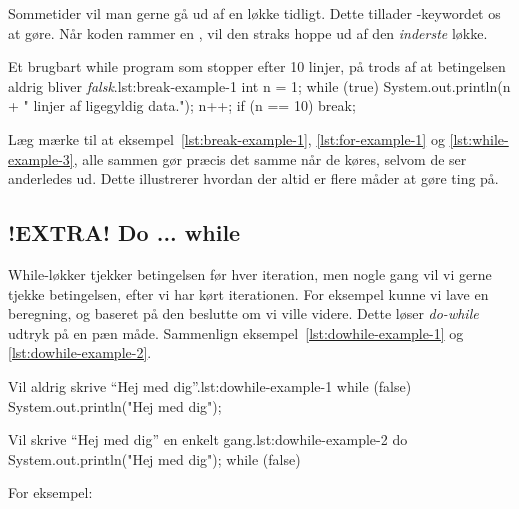 
		Sommetider vil man gerne gå ud af en løkke tidligt. Dette tillader
        -keywordet os at gøre. Når koden rammer en
        , vil den straks hoppe ud af den
        \emph{inderste} løkke.

        \begin{JavaCode}{Et brugbart while program som stopper efter 10 linjer, på trods af at betingelsen aldrig bliver \emph{falsk}.}{lst:break-example-1}
			int n = 1;
			while (true) {
				System.out.println(n + " linjer af ligegyldig data.");
				n++;
				if (n == 10)  break;
			}
		\end{JavaCode}

        Læg mærke til at eksempel~\ref{lst:break-example-1},
        \ref{lst:for-example-1} og \ref{lst:while-example-3}, alle
        sammen gør præcis det samme når de køres, selvom de ser
        anderledes ud. Dette illustrerer hvordan der altid er flere
        måder at gøre ting på.


	\subsection{!EXTRA! Do ... while}


        While-løkker tjekker betingelsen før hver iteration, men nogle
        gang vil vi gerne tjekke betingelsen, efter vi har kørt
        iterationen. For eksempel kunne vi lave en beregning, og
        baseret på den beslutte om vi ville videre. Dette løser
        \emph{do-while} udtryk på en pæn måde. Sammenlign
        eksempel~\ref{lst:dowhile-example-1} og
        \ref{lst:dowhile-example-2}.

		\begin{JavaCode}{Vil aldrig skrive ``Hej med dig''.}{lst:dowhile-example-1}
			while (false) {
				System.out.println("Hej med dig");
			}
		\end{JavaCode}

		\begin{JavaCode}{Vil skrive ``Hej med dig'' en enkelt gang.}{lst:dowhile-example-2}
			do {
				System.out.println("Hej med dig");
			} while (false)
		\end{JavaCode}

		For eksempel:

